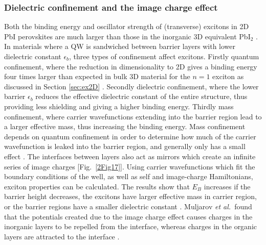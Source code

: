\subsubsection{Dielectric confinement and the image charge effect}

Both the binding energy and oscillator strength of (transverse) excitons in 2D PbI perovskites are much larger than those in the inorganic 3D equivalent Pb$\textrm{I}_2$ \cite{Hirasawa1994}. In materials where a QW is sandwiched between barrier layers with lower dielectric constant $\epsilon_b$, three types of confinement affect excitons. Firstly quantum confinement, where the reduction in dimensionality to 2D gives a binding energy four times larger than expected in bulk 3D material for the $n=1$ exciton as discussed in Section \ref{sec:ex2D} \cite{Shinada1966}. Secondly dielectric confinement, where the lower barrier $\epsilon_b$ reduces the effective dielectric constant of the entire structure, thus providing less shielding and giving a higher binding energy. Thirdly mass confinement, where carrier wavefunctions extending into the barrier region lead to a larger effective mass, thus increasing the binding energy. Mass confinement depends on quantum confinement in order to determine how much of the carrier wavefunction is leaked into the barrier region, and generally only has a small effect \cite{Kumagai1989}. The interfaces between layers also act as mirrors which create an infinite series of image charges [Fig.\ \ref{2Fig17}]. Using carrier wavefunctions which fit the boundary conditions of the well, as well as self and image-charge Hamiltonians, exciton properties can be calculated. The results show that $E_B$ increases if the barrier height decreases, the excitons have larger effective mass in carrier region, or the barrier regions have a smaller dielectric constant \cite{Kumagai1989}. Muljarov \textit{et al.}\ found that the potentials created due to the image charge effect causes charges in the inorganic layers to be repelled from the interface, whereas charges in the organic layers are attracted to the interface \cite{Muljarov1995}.
